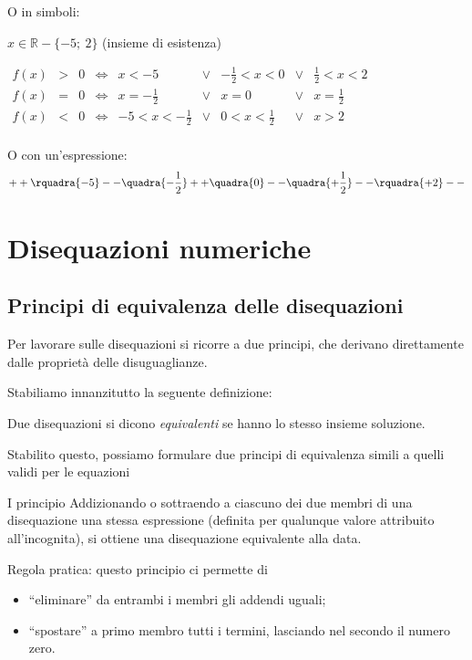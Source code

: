 O in simboli:

\(x \in \mathbb{R} - \{ -5;~2 \}\) (insieme di esistenza)

\(\begin{array}{cccccccccc}
f(x) & > & 0 & \Leftrightarrow &
 x < -5 & \lor & -\frac{1}{2} < x < 0 & \lor & \frac{1}{2} < x < 2 \\
f(x) & = & 0 & \Leftrightarrow &
 x = -\frac{1}{2} & \lor & x = 0 & \lor & x = \frac{1}{2} \\
f(x) & < & 0 & \Leftrightarrow &
 -5 < x < -\frac{1}{2} & \lor & 0 < x < \frac{1}{2} & \lor & x > 2 \\
\end{array}\)

\vspace{1em}
O con un'espressione:
\[++\rquadra{-5}--\quadra{-\dfrac{1}{2}}++\quadra{0}
  --\quadra{+\dfrac{1}{2}}--\rquadra{+2}--\]

\section{Disequazioni numeriche}
\label{sec:dis_numeriche}

\subsection{Principi di equivalenza delle disequazioni}

Per lavorare sulle disequazioni si ricorre a due principi, che derivano 
direttamente dalle proprietà delle disuguaglianze.

Stabiliamo innanzitutto la seguente definizione:

\begin{definizione}{}{}
Due disequazioni si dicono \emph{equivalenti} se hanno lo
stesso insieme soluzione.
\end{definizione}

Stabilito questo, possiamo formulare due principi di equivalenza
simili a quelli validi per le equazioni

\begin{teorema}{I principio}{}
\label{ppd}
Addizionando o sottraendo a ciascuno dei due membri di
una disequazione una stessa espressione (definita per qualunque
valore attribuito all'incognita), si ottiene una
disequazione equivalente alla data.
\end{teorema}

Regola pratica: questo principio ci permette di
\begin{itemize} [nosep]
\item ``eliminare'' da entrambi i membri gli addendi uguali;
\item ``spostare'' a primo membro tutti i termini, lasciando nel secondo il 
numero zero.
\end{itemize}

